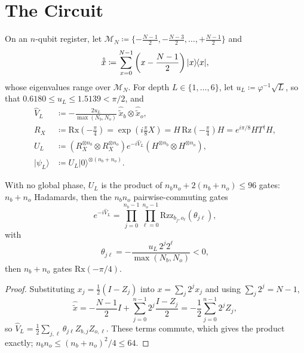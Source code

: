 \documentclass[11pt,a4paper]{article}
\theoremstyle{plain}
\theoremstyle{definition}
\theoremstyle{remark}
\newcommand{\ket}[1]{\lvert#1\rangle}
\newcommand{\ketbra}[2]{\lvert#1\rangle\mkern-2mu\langle#2\rvert}
\newcommand{\proj}[1]{\ketbra{#1}{#1}}
\begin{document}
\clearpage
\section{The Circuit}\label{sec:circuit}

\begin{definition}\label{def:ising-rx}
  On an \( n \)-qubit register, let
  \( \mathcal{M}_N \coloneqq \{-\tfrac{N-1}{2}, -\tfrac{N-3}{2}, \dots, +\tfrac{N-1}{2}\} \) and
  \begin{equation}\label{eq:centered-x}
    \hat{\tilde{x}} \coloneqq \sum_{x=0}^{N-1} \left(x - \frac{N - 1}{2}\right)\proj{x},
  \end{equation}
  whose eigenvalues range over \( \mathcal{M}_N \). For depth \( L \in \{1, \dots, 6\} \), let
  \( u_L \coloneqq \varphi^{-1}\sqrt{L} \), so that \( 0.6180 \le u_L \le 1.5139 < \pi / 2 \), and
  \begin{align}
    \hat{V}_L &\coloneqq -\frac{2 u_L}{\max(N_b, N_o)}\, \hat{\tilde{x}}_b \otimes \hat{\tilde{x}}_o,
    \label{eq:pos-ham} \\
    R_X &\coloneqq \mathrm{Rx}\left(-\frac{\pi}{4}\right) = \exp\left(i\frac{\pi}{8} X\right) =
    H\,\mathrm{Rz}\left(-\frac{\pi}{4}\right) H = e^{i\pi / 8} H T^\dagger H, \label{eq:rx-gate} \\
    U_L &\coloneqq \left(R_X^{\otimes n_b} \otimes R_X^{\otimes n_o}\right) e^{-i\hat{V}_L}
    \left(H^{\otimes n_b} \otimes H^{\otimes n_o}\right), \label{eq:ising-rx-unitary} \\
    \ket{\psi_L} &\coloneqq U_L \ket{0}^{\otimes(n_b + n_o)}.
    \label{eq:ising-rx-state}
  \end{align}
\end{definition}

\begin{proposition}\label{prop:compile}
  With no global phase, \( U_L \) is the product of \( n_b n_o + 2(n_b + n_o) \le 96 \) gates:
  \( n_b + n_o \) Hadamards, then the \( n_b n_o \) pairwise-commuting gates
  \[
    e^{-i\hat{V}_L} = \prod_{j=0}^{n_b - 1}\prod_{\ell=0}^{n_o - 1}
    \mathrm{Rzz}_{b_j, o_\ell}(\theta_{j\ell}),
  \]
  with
  \begin{equation}\label{eq:rzz-pos}
    \theta_{j\ell} = -\frac{u_L\, 2^j 2^\ell}{\max(N_b, N_o)} < 0,
  \end{equation}
  then \( n_b + n_o \) gates \( \mathrm{Rx}(-\pi / 4) \).
\end{proposition}
\begin{proof}
  Substituting \( x_j = \frac{1}{2}(I - Z_j) \) into \( x = \sum_j 2^j x_j \) and using
  \( \sum_j 2^j = N - 1 \),
  \begin{equation}\label{eq:pauli-x}
    \hat{\tilde{x}} = -\frac{N - 1}{2} I + \sum_{j=0}^{n-1} 2^j \frac{I - Z_j}{2} =
    -\frac{1}{2}\sum_{j=0}^{n-1} 2^j Z_j,
  \end{equation}
  so \( \hat{V}_L = \frac{1}{2}\sum_{j,\ell} \theta_{j\ell} Z_{b,j} Z_{o,\ell} \). These terms
  commute, which gives the product exactly; \( n_b n_o \le {(n_b + n_o)}^2 / 4 \le 64 \).
\end{proof}
\end{document}
